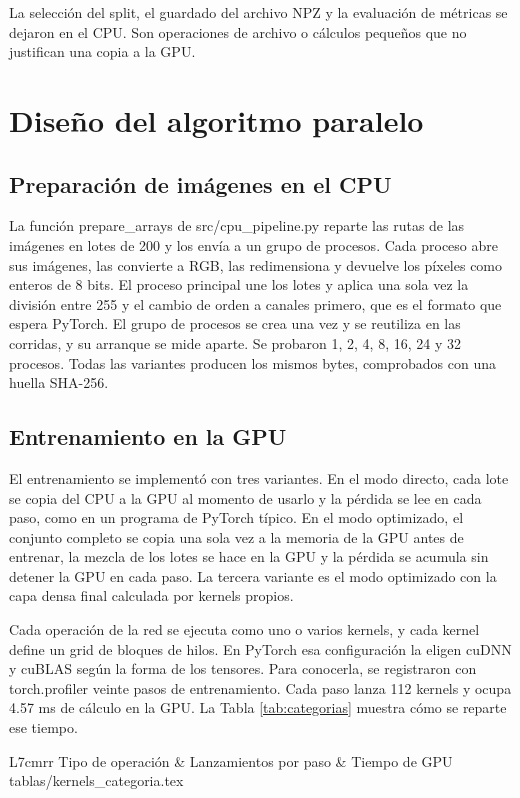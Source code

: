 \documentclass[11pt,letterpaper]{article}
\makeatletter
\newcommand{\filastabla}[1]{\@@input #1 }
\makeatother
\begin{document}
La selección del split, el guardado del archivo NPZ y la evaluación de métricas se dejaron en el CPU. Son operaciones de archivo o cálculos pequeños que no justifican una copia a la GPU.

\section{Diseño del algoritmo paralelo}

\subsection{Preparación de imágenes en el CPU}
La función prepare\_arrays de src/cpu\_pipeline.py reparte las rutas de las imágenes en lotes de 200 y los envía a un grupo de procesos. Cada proceso abre sus imágenes, las convierte a RGB, las redimensiona y devuelve los píxeles como enteros de 8 bits. El proceso principal une los lotes y aplica una sola vez la división entre 255 y el cambio de orden a canales primero, que es el formato que espera PyTorch. El grupo de procesos se crea una vez y se reutiliza en las corridas, y su arranque se mide aparte. Se probaron 1, 2, 4, 8, 16, 24 y 32 procesos. Todas las variantes producen los mismos bytes, comprobados con una huella SHA-256.

\subsection{Entrenamiento en la GPU}
El entrenamiento se implementó con tres variantes. En el modo directo, cada lote se copia del CPU a la GPU al momento de usarlo y la pérdida se lee en cada paso, como en un programa de PyTorch típico. En el modo optimizado, el conjunto completo se copia una sola vez a la memoria de la GPU antes de entrenar, la mezcla de los lotes se hace en la GPU y la pérdida se acumula sin detener la GPU en cada paso. La tercera variante es el modo optimizado con la capa densa final calculada por kernels propios.

Cada operación de la red se ejecuta como uno o varios kernels, y cada kernel define un grid de bloques de hilos. En PyTorch esa configuración la eligen cuDNN y cuBLAS según la forma de los tensores. Para conocerla, se registraron con torch.profiler veinte pasos de entrenamiento. Cada paso lanza 112 kernels y ocupa 4.57 ms de cálculo en la GPU. La Tabla \ref{tab:categorias} muestra cómo se reparte ese tiempo.

\begin{table}[H]
\centering
\small
\caption{Kernels de un paso de entrenamiento por tipo de operación.}
\label{tab:categorias}
\begin{tabular}{L{7cm}rr}
\toprule
Tipo de operación & Lanzamientos por paso & Tiempo de GPU \\
\midrule
\filastabla{tablas/kernels_categoria.tex}
\bottomrule
\end{tabular}
\end{table}
\end{document}
